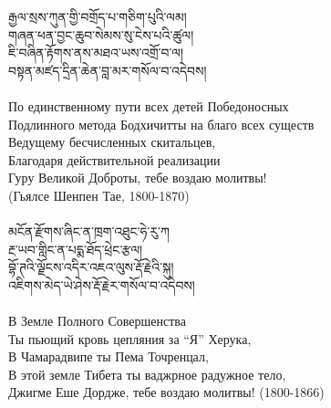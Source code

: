 {\ti རྒྱལ་སྲས་ཀུན་གྱི་བགྲོད་པ་གཅིག་པུའི་ལམ། \\
གཞན་ཕན་བྱང་ཆུབ་སེམས་སུ་ངེས་པའི་ཚུལ། \\
ཇི་བཞིན་རྟོགས་ནས་མཐའ་ཡས་འགྲོ་བ་ལ། \\
བསྟན་མཛད་དྲིན་ཆེན་བླ་མར་གསོལ་བ་འདེབས།}\\
\\
\ru
По единственному пути всех детей Победоносных\\
Подлинного метода Бодхичитты на благо всех существ\\
Ведущему бесчисленных скитальцев,\\
Благодаря действительной реализации \\
Гуру Великой Доброты, тебе воздаю молитвы!\\
\hspace{2cm}(Гьялсе Шенпен Тае, 1800-1870)\\
\\
{\ti མངོན་རྫོགས་ཞིང་ན་ཁྲག་འཐུང་ཧེ་རུ་ཀ \\
རྔ་ཡབ་གླིང་ན་པདྨ་ཐོད་ཕྲེང་རྩལ། \\
བྷོ་ཊའི་ལྗོངས་འདིར་འཇའ་ལུས་རྡོ་རྗེའི་སྐུ། \\
འཇིགས་མེད་ཡེ་ཤེས་རྡོ་རྗེར་གསོལ་བ་འདེབས།}\\
\\
\ru
В Земле Полного Совершенства\\
Ты пьющий кровь цепляния за “Я” Херука,\\
В Чамарадвипе ты Пема Точренцал,\\
В этой земле Тибета ты ваджрное радужное тело,\\
Джигме Еше Дордже, тебе воздаю молитвы! (1800-1866)\\
\\
\newpage

